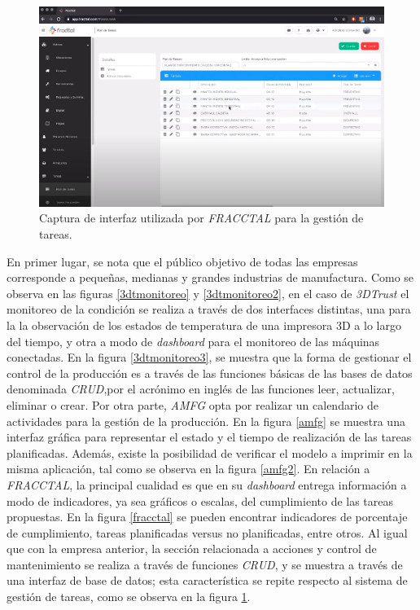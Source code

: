 \begin{figure}[H]
\centering
\includegraphics[scale=0.9]{images/fracctal2.png}
\caption{Captura de interfaz utilizada por \textit{FRACCTAL} para la gestión de tareas.}
\label{fracctal3}
\end{figure}

En primer lugar, se nota que el público objetivo de todas las empresas corresponde a pequeñas, medianas y grandes industrias de manufactura. Como se observa en las figuras \ref{3dtmonitoreo} y \ref{3dtmonitoreo2}, en el caso de \textit{3DTrust} el monitoreo de la condición se realiza a través de dos interfaces distintas, una para la la observación de los estados de temperatura de una impresora 3D a lo largo del tiempo, y otra a modo de \textit{dashboard} para el monitoreo de las máquinas conectadas. En la figura \ref{3dtmonitoreo3}, se muestra que la forma de gestionar el control de la producción es a través de las funciones básicas de las bases de datos denominada \textit{CRUD},por el acrónimo en inglés de las funciones leer, actualizar, eliminar o crear. Por otra parte, \textit{AMFG} opta por realizar un calendario de actividades para la gestión de la producción. En la figura \ref{amfg} se muestra una interfaz gráfica para representar el estado y el tiempo de realización de las tareas planificadas. Además, existe la posibilidad de verificar el modelo a imprimir en la misma aplicación, tal como se observa en la figura \ref{amfg2}. En relación a \textit{FRACCTAL}, la principal cualidad es que en su \textit{dashboard} entrega información a modo de indicadores, ya sea gráficos o escalas, del cumplimiento de las tareas propuestas. En la figura \ref{fracctal} se pueden encontrar indicadores de porcentaje de cumplimiento, tareas planificadas versus no planificadas, entre otros. Al igual que con la empresa anterior, la sección relacionada a acciones y control de mantenimiento se realiza a través de funciones \textit{CRUD}, y se muestra a través de una interfaz de base de datos; esta característica se repite respecto al sistema de gestión de tareas, como se observa en la figura \ref{fracctal3}.


